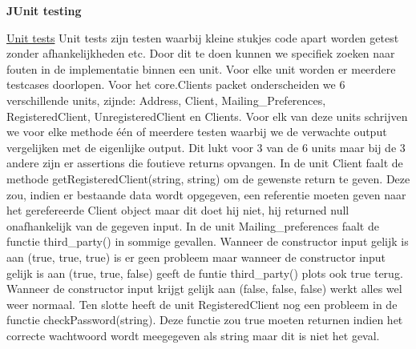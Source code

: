 \documentclass{article}
\begin{document}
\newpage
\maketitle
\noindent
\textbf{JUnit testing}\newline
\newline

\maketitle
\noindent
\underline{Unit tests}\newline
\newline
Unit tests zijn testen waarbij kleine stukjes code apart worden getest zonder afhankelijkheden etc. Door dit te doen kunnen we specifiek zoeken naar fouten in de implementatie binnen een unit. Voor elke unit worden er meerdere testcases doorlopen. Voor het core.Clients packet onderscheiden we 6 verschillende units, zijnde: Address, Client, Mailing\_Preferences, RegisteredClient, UnregisteredClient en Clients. \newline
\newline
Voor elk van deze units schrijven we voor elke methode één of meerdere testen waarbij we de verwachte output vergelijken met de eigenlijke output.\newline
\newline
Dit lukt voor 3 van de 6 units maar bij de 3 andere zijn er assertions die foutieve returns opvangen. \newline
\newline
In de unit Client faalt de methode getRegisteredClient(string, string) om de gewenste return te geven. Deze zou, indien er bestaande data wordt opgegeven, een referentie moeten geven naar het gerefereerde Client object maar dit doet hij niet, hij returned null onafhankelijk van de gegeven input.\newline
\newline
In de unit Mailing\_preferences faalt de functie third\_party() in sommige gevallen. Wanneer de constructor input gelijk is aan (true, true, true) is er geen probleem maar wanneer de constructor input gelijk is aan (true, true, false) geeft de funtie third\_party() plots ook true terug. Wanneer de constructor input krijgt gelijk aan (false, false, false) werkt alles wel weer normaal. \newline
\newline
Ten slotte heeft de unit RegisteredClient nog een probleem in de functie checkPassword(string). Deze functie zou true moeten returnen indien het correcte wachtwoord wordt meegegeven als string maar dit is niet het geval.
\end{document}
